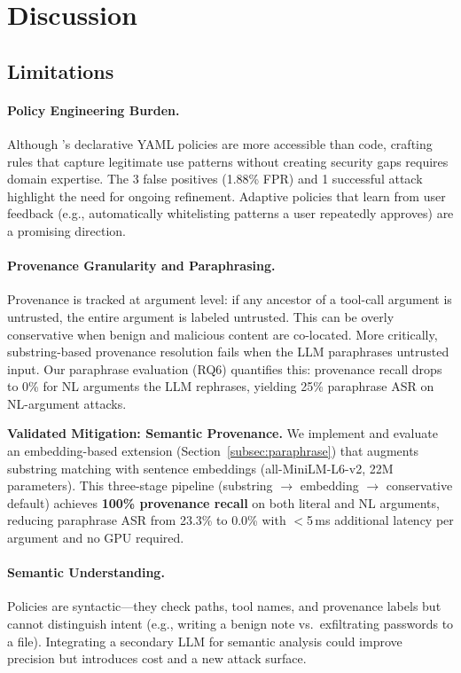 \section{Discussion}
\label{sec:discussion}

\subsection{Limitations}

\paragraph{Policy Engineering Burden.}
Although \sys{}'s declarative YAML policies are more accessible than code, crafting rules that capture legitimate use patterns without creating security gaps requires domain expertise. The 3 false positives (1.88\% FPR) and 1 successful attack highlight the need for ongoing refinement. Adaptive policies that learn from user feedback (e.g., automatically whitelisting patterns a user repeatedly approves) are a promising direction.

\paragraph{Provenance Granularity and Paraphrasing.}
Provenance is tracked at argument level: if any ancestor of a tool-call argument is untrusted, the entire argument is labeled untrusted. This can be overly conservative when benign and malicious content are co-located. More critically, substring-based provenance resolution fails when the LLM paraphrases untrusted input. Our paraphrase evaluation (RQ6) quantifies this: provenance recall drops to 0\% for NL arguments the LLM rephrases, yielding 25\% paraphrase ASR on NL-argument attacks.

\textbf{Validated Mitigation: Semantic Provenance.} We implement and evaluate an embedding-based extension (Section~\ref{subsec:paraphrase}) that augments substring matching with sentence embeddings (all-MiniLM-L6-v2, 22M parameters). This three-stage pipeline (substring $\to$ embedding $\to$ conservative default) achieves \textbf{100\% provenance recall} on both literal and NL arguments, reducing paraphrase ASR from 23.3\% to 0.0\% with $<$5\,ms additional latency per argument and no GPU required.

\paragraph{Semantic Understanding.}
Policies are syntactic---they check paths, tool names, and provenance labels but cannot distinguish intent (e.g., writing a benign note vs.\ exfiltrating passwords to a file). Integrating a secondary LLM for semantic analysis could improve precision but introduces cost and a new attack surface.

